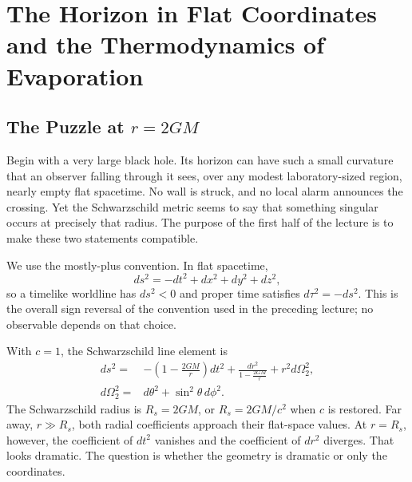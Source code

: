 \chapter{The Horizon in Flat Coordinates and the Thermodynamics of Evaporation}


\section{The Puzzle at \texorpdfstring{\(r=2GM\)}{r=2GM}}

Begin with a very large black hole. Its horizon can have such a small curvature that an observer falling through it sees, over any modest laboratory-sized region, nearly empty flat spacetime. No wall is struck, and no local alarm announces the crossing. Yet the Schwarzschild metric seems to say that something singular occurs at precisely that radius. The purpose of the first half of the lecture is to make these two statements compatible.

We use the mostly-plus convention. In flat spacetime,
\begin{equation}
ds^2=-dt^2+dx^2+dy^2+dz^2,
\end{equation}
so a timelike worldline has \(ds^2<0\) and proper time satisfies \(d\tau^2=-ds^2\). This is the overall sign reversal of the convention used in the preceding lecture; no observable depends on that choice.

With \(c=1\), the Schwarzschild line element is
\begin{equation}
\begin{aligned}
ds^2={}&-\left(1-\frac{2GM}{r}\right)dt^2
+\frac{dr^2}{1-\frac{2GM}{r}}
+r^2d\Omega_2^2,\\
d\Omega_2^2={}&d\theta^2+\sin^2\theta\,d\phi^2 .
\end{aligned}
\label{eq:l03-schwarzschild}
\end{equation}
The Schwarzschild radius is \(R_s=2GM\), or \(R_s=2GM/c^2\) when \(c\) is restored. Far away, \(r\gg R_s\), both radial coefficients approach their flat-space values. At \(r=R_s\), however, the coefficient of \(dt^2\) vanishes and the coefficient of \(dr^2\) diverges. That looks dramatic. The question is whether the geometry is dramatic or only the coordinates.


